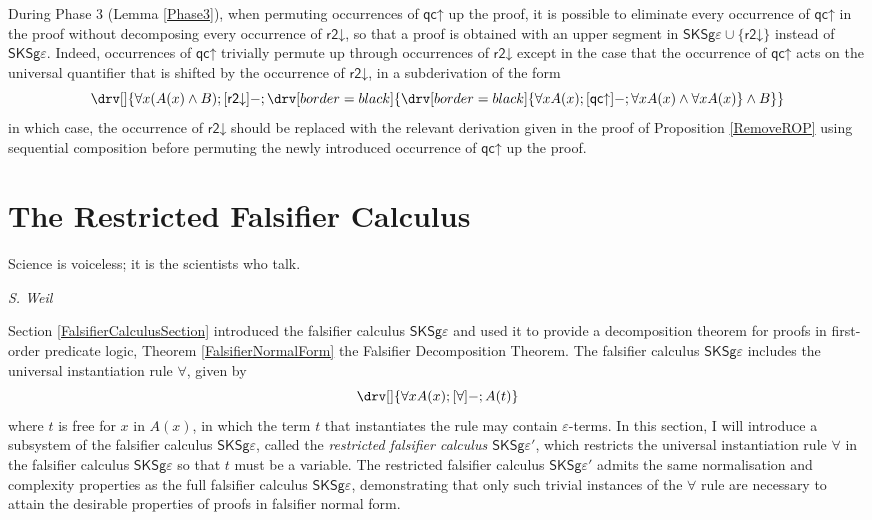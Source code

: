 \documentclass[10pt]{article}
\theoremstyle{definition}\newtheorem{remark}[theorem]{Remark}
\theoremstyle{definition}\newtheorem{example}[theorem]{Example}
\theoremstyle{definition}\newtheorem{definition}[theorem]{Definition}
\newcommand{\FalsifierCalculus}{{\mathsf{SKSg\varepsilon}}}
\newcommand{\FalsifierCalculusPrime}{{\mathsf{SKSg\varepsilon'}}}
\newcommand{\qcUp}{{\mathsf{qc\mathord\uparrow}}}
\newcommand{\rTwoDown}{{\mathsf{r2\mathord\downarrow}}}
\begin{document}
	During Phase 3 (Lemma \ref{Phase3}), when permuting occurrences of $\qcUp$ up the proof, it is possible to eliminate every occurrence of $\qcUp$ in the proof without decomposing every occurrence of $\rTwoDown$, so that a proof is obtained with an upper segment in $\FalsifierCalculus \cup \{\rTwoDown\}$ instead of $\FalsifierCalculus$. Indeed, occurrences of $\qcUp$ trivially permute up through occurrences of $\rTwoDown$ except in the case that the occurrence of $\qcUp$ acts on the universal quantifier that is shifted by the occurrence of $\rTwoDown$, in a subderivation of the form
	\[
	\drv[] {
		\forall x (A(x) \land B) ; [\rTwoDown]- ; \drv[border=black] {
			\drv[border=black] {
				\forall x A(x) ; [\qcUp]- ; \forall x A(x) \land \forall x A(x)
			} \land B
		}
	}
	\]
	in which case, the occurrence of $\rTwoDown$ should be replaced with the relevant derivation given in the proof of Proposition \ref{RemoveROP} using sequential composition before permuting the newly introduced occurrence of $\qcUp$ up the proof.
	
	\pagebreak
	
	\section{The Restricted Falsifier Calculus}\label{RestrictedFalsifierCalculusSection}
	
	\epigraph{Science is voiceless; it is the scientists who talk.}{\textit{S. Weil}}
	
	\noindent
	Section \ref{FalsifierCalculusSection} introduced the falsifier calculus $\FalsifierCalculus$ and used it to provide a decomposition theorem for proofs in first-order predicate logic, Theorem \ref{FalsifierNormalForm} the Falsifier Decomposition Theorem. The falsifier calculus $\FalsifierCalculus$ includes the universal instantiation rule $\forall$, given by
	\[
		\drv[] {
			\forall x A(x) ; [\forall]- ; A(t)
		}
	\]
	where $t$ is free for $x$ in $A(x)$, in which the term $t$ that instantiates the rule may contain $\varepsilon$-terms. In this section, I will introduce a subsystem of the falsifier calculus $\FalsifierCalculus$, called the \textit{restricted falsifier calculus $\FalsifierCalculusPrime$}, which restricts the universal instantiation rule $\forall$ in the falsifier calculus $\FalsifierCalculus$ so that $t$ must be a variable. The restricted falsifier calculus $\FalsifierCalculusPrime$ admits the same normalisation and complexity properties as the full falsifier calculus $\FalsifierCalculus$, demonstrating that only such trivial instances of the $\forall$ rule are necessary to attain the desirable properties of proofs in falsifier normal form.
	
\end{document}
